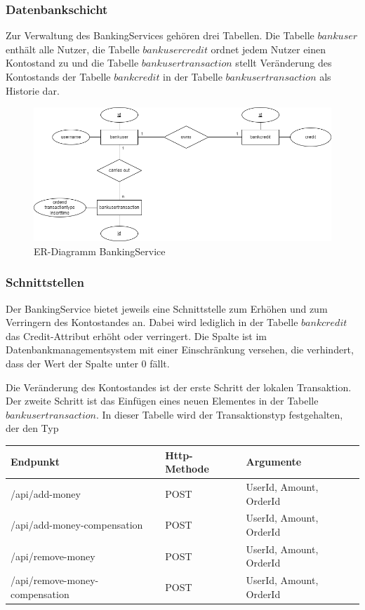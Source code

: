 \subsubsection{Datenbankschicht} %
Zur Verwaltung des BankingServices gehören drei Tabellen. Die Tabelle $bankuser$ enthält alle Nutzer, die Tabelle $bankusercredit$ ordnet jedem Nutzer einen Kontostand zu und die Tabelle $bankusertransaction$ stellt Veränderung des Kontostands der Tabelle $bankcredit$ in der Tabelle $bankusertransaction$ als Historie dar.

\begin{figure}[h!]
	\centering
	\includegraphics[scale=0.5]{figures/DatabaseER/BankingServiceTables.png}
	\caption{ER-Diagramm BankingService}
\end{figure}
\FloatBarrier

\subsubsection{Schnittstellen}
Der BankingService bietet jeweils eine Schnittstelle zum Erhöhen und zum Verringern des Kontostandes an. Dabei wird lediglich in der Tabelle $bankcredit$ das Credit-Attribut erhöht oder verringert. Die Spalte ist im Datenbankmanagementsystem mit einer Einschränkung versehen, die verhindert, dass der Wert der Spalte unter 0 fällt. 

Die Veränderung des Kontostandes ist der erste Schritt der lokalen Transaktion. Der zweite Schritt ist das Einfügen eines neuen Elementes in der Tabelle $bankusertransaction$. In dieser Tabelle wird der Transaktionstyp festgehalten, der den Typ

\begin{center}
	\begin{tabular}[h]{|l|l|l|}
		\hline
		Endpunkt & Http-Methode & Argumente \\ \hline
		/api/add-money & POST & UserId, Amount, OrderId \\ \hline
		/api/add-money-compensation & POST & UserId, Amount, OrderId \\ \hline
		/api/remove-money & POST & UserId, Amount, OrderId \\ \hline
		/api/remove-money-compensation & POST & UserId, Amount, OrderId \\ \hline 
	\end{tabular}
\end{center}
\FloatBarrier

